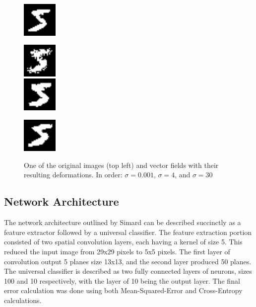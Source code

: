 \documentclass{article}
\begin{document}
\begin{figure}
  \centering
  \includegraphics[width=0.15\textwidth]{original.png}
  
  \includegraphics[width=0.15\textwidth]{deform1.png}\\
  
  \includegraphics[width=0.15\textwidth]{deform2.png}
  
  \includegraphics[width=0.15\textwidth]{deform3.png}
  \label{fig:deforms}
  \caption{One of the original images (top left) and vector fields with their resulting deformations. In order: $\sigma=0.001$, $\sigma=4$, and $\sigma=30$}
\end{figure}

\subsection{Network Architecture}
The network architecture outlined by Simard can be described succinctly as a feature extractor followed by a universal classifier. The feature extraction portion consisted of two spatial convolution layers, each having a kernel of size 5. This reduced the input image from 29x29 pixels to 5x5 pixels. The first layer of convolution output 5 planes size 13x13, and the second layer produced 50 planes. The universal classifier is described as two fully connected layers of neurons, sizes 100 and 10 respectively, with the layer of 10 being the output layer. The final error calculation was done using both Mean-Squared-Error and Cross-Entropy calculations.
\end{document}
